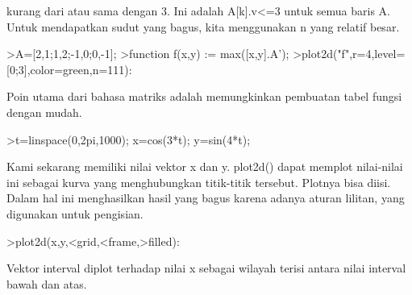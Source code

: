 \begin{eulernotebook}
\begin{eulercomment}
kurang dari atau sama dengan 3. Ini adalah A[k].v\textless{}=3 untuk semua baris
A. Untuk mendapatkan sudut yang bagus, kita menggunakan n yang relatif
besar.
\end{eulercomment}
\begin{eulerprompt}
>A=[2,1;1,2;-1,0;0,-1];
>function f(x,y) := max([x,y].A');
>plot2d("f",r=4,level=[0;3],color=green,n=111):
\end{eulerprompt}
\begin{eulercomment}
Poin utama dari bahasa matriks adalah memungkinkan pembuatan tabel
fungsi dengan mudah.
\end{eulercomment}
\begin{eulerprompt}
>t=linspace(0,2pi,1000); x=cos(3*t); y=sin(4*t);
\end{eulerprompt}
\begin{eulercomment}
Kami sekarang memiliki nilai vektor x dan y. plot2d() dapat memplot
nilai-nilai ini sebagai kurva yang menghubungkan titik-titik tersebut.
Plotnya bisa diisi. Dalam hal ini menghasilkan hasil yang bagus karena
adanya aturan lilitan, yang digunakan untuk pengisian.
\end{eulercomment}
\begin{eulerprompt}
>plot2d(x,y,<grid,<frame,>filled):
\end{eulerprompt}
\begin{eulercomment}
Vektor interval diplot terhadap nilai x sebagai wilayah terisi antara
nilai interval bawah dan atas.


\end{eulercomment}
\end{eulernotebook}
